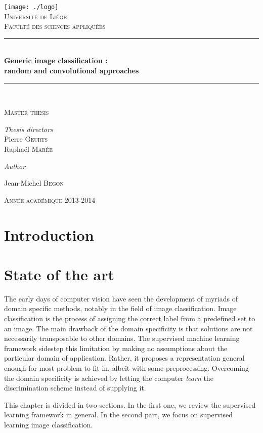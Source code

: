 \documentclass[a4paper]{report}
\newlength{\larg}
\newcommand{\titleg}{
  \begin{titlepage}
  \begin{center}

  \bigskip
  \bigskip
  \bigskip
  \bigskip 
  \bigskip


  \texttt{[image: ./logo]}\\[1cm]
  \smallskip
  \textsc{\LARGE Université de Liège}\\
  \smallskip
  \textsc{Faculté des sciences appliquées}\\

  \bigskip



  \rule{\columnwidth}{1pt} \\[0.4cm] 
  { \huge \bfseries Generic image classification : \\ \bigskip random and convolutional approaches}\\[0.4cm]
  \rule{\columnwidth}{1pt} \\[0.2cm]



  \begin{minipage}{0.7\textwidth} 
  \begin{center} \large 
  \textsc{Master thesis}
  \end{center} \end{minipage}

  \vfill


  \begin{minipage}{0.7\textwidth} \begin{center}
  \textit{Thesis directors} \\
  \large Pierre \textsc{Geurts} \\
  \large Raphaël \textsc{Marée} 
  \end{center} \end{minipage} 

  \bigskip
  \bigskip
  \bigskip

  \textit{Author} \\
  \begin{minipage}{0.7\textwidth} \begin{center}
  \large Jean-Michel \textsc{Begon}
  \end{center} \end{minipage} 
  


  \bigskip
  \bigskip
  \bigskip

  \textsc{Année académique 2013-2014}
  \end{center}
  \end{titlepage}
}
\begin{document}
\titleg
\thispagestyle{empty}
\newpage
{}

\pagestyle{fancy}
\lhead{}
\chead{}
\rhead{\itshape \textcolor{gris}{\rightmark}} %
\lfoot{\itshape \textcolor{gris}{Generic image classification - The RandConv framework}}
\cfoot{}
\rfoot{\itshape \textcolor{gris}{\thepage}}
\renewcommand{\headrulewidth}{0.4pt}
\renewcommand{\footrulewidth}{0.4pt}

\newpage 


\tableofcontents

\chapter{Introduction}
\chapter{State of the art}
The early days of computer vision have seen the development of myriads of domain specific methods, notably in the field of image classification. Image classification is the process of assigning the correct label from a predefined set to an image. The main drawback of the domain specificity is that solutions are not necessarily transposable to other domains. The supervised machine learning framework sidestep this limitation by making no assumptions about the particular domain of application. Rather, it proposes a representation general enough for most problem to fit in, albeit with some preprocessing. Overcoming the domain specificity is achieved by letting the computer \textit{learn} the discrimination scheme instead of supplying it.
\par
This chapter is divided in two sections. In the first one, we review the supervised learning framework in general. In the second part, we focus on supervised learning image classification.
\end{document}

